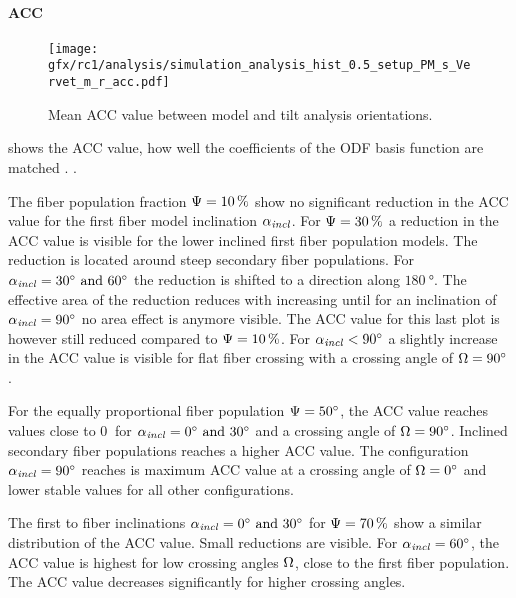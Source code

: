 \paragraph{\acs{ACC}}
%
\begin{figure}[!p]
\centering
\texttt{[image: gfx/rc1/analysis/simulation\_analysis\_hist\_0.5\_setup\_PM\_s\_Vervet\_m\_r\_acc.pdf]}
\caption{Mean \ac{ACC} value between model and tilt analysis orientations. }
\label{fig:sim_ana_acc}
\end{figure}
% 
 shows the  \ac{ACC} value, \ie{} how well the coefficients of the \ac{ODF} basis function are matched \cite{Schilling2018}.
.
\par
% 
The fiber population fraction $\textnormal{$\Psi$}=\SI{10}{\percent}$ show no significant reduction in the \ac{ACC} value for the first fiber model inclination $\textnormal{$\alpha_{\mathit{incl}}$}$.
For $\textnormal{$\Psi$}=\SI{30}{\percent}$ a reduction in the \ac{ACC} value is visible for the lower inclined first fiber population models.
The reduction is located around steep secondary fiber populations.
For $\modelInc = \SIlist{30;60}{\degree}$ the reduction is shifted to a direction along $\SI{180}{\degree}$.
The effective area of the reduction reduces with increasing \modelInc{} until for an inclination of $\textnormal{$\alpha_{\mathit{incl}}$}=\SI{90}{\degree}$ no area effect is anymore visible.
The \ac{ACC} value for this last plot is however still reduced compared to $\textnormal{$\Psi$}=\SI{10}{\percent}$.
For $\textnormal{$\alpha_{\mathit{incl}}$} < \SI{90}{\degree}$ a slightly increase in the \ac{ACC} value is visible for flat fiber crossing with a crossing angle of $\textnormal{$\Omega$}=\SI{90}{\degree}$.
\par
%
For the equally proportional fiber population $\textnormal{$\Psi$} = \SI{50}{\degree}$, the \ac{ACC} value reaches values close to $\SI{0}{}$ for $\modelInc = \SIlist{0;30}{\degree}$ and a crossing angle of $\textnormal{$\Omega$}=\SI{90}{\degree}$.
Inclined secondary fiber populations reaches a higher \ac{ACC} value.
The configuration $\textnormal{$\alpha_{\mathit{incl}}$} = \SI{90}{\degree}$ reaches is maximum \ac{ACC} value at a crossing angle of $\textnormal{$\Omega$}=\SI{0}{\degree}$ and lower stable values for all other configurations.
\par
%
The first to fiber inclinations $\modelInc = \SIlist{0;30}{\degree}$ for $\textnormal{$\Psi$}=\SI{70}{\percent}$ show a similar distribution of the \ac{ACC} value. 
Small reductions are visible.
For $\textnormal{$\alpha_{\mathit{incl}}$}=\SI{60}{\degree}$, the \ac{ACC} value is highest for low crossing angles $\textnormal{$\Omega$}$, \ie{} close to the first fiber population.
The \ac{ACC} value decreases significantly for higher crossing angles.
